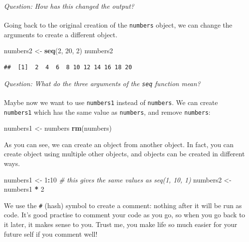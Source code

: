 \documentclass[
]{book}
\newenvironment{Shaded}{\begin{snugshade}}{\end{snugshade}}
\newcommand{\CommentTok}[1]{\textcolor[rgb]{0.56,0.35,0.01}{\textit{#1}}}
\newcommand{\DecValTok}[1]{\textcolor[rgb]{0.00,0.00,0.81}{#1}}
\newcommand{\KeywordTok}[1]{\textcolor[rgb]{0.13,0.29,0.53}{\textbf{#1}}}
\newcommand{\NormalTok}[1]{#1}
\newcommand{\OperatorTok}[1]{\textcolor[rgb]{0.81,0.36,0.00}{\textbf{#1}}}
\newcommand{\StringTok}[1]{\textcolor[rgb]{0.31,0.60,0.02}{#1}}
\begin{document}
\emph{Question: How has this changed the output?}\\
~\\

Going back to the original creation of the \texttt{numbers} object, we can change the
arguments to create a different object.

\begin{Shaded}
\begin{Highlighting}[]
\NormalTok{numbers2 <-}\StringTok{ }\KeywordTok{seq}\NormalTok{(}\DecValTok{2}\NormalTok{, }\DecValTok{20}\NormalTok{, }\DecValTok{2}\NormalTok{)}
\NormalTok{numbers2}
\end{Highlighting}
\end{Shaded}

\begin{verbatim}
##  [1]  2  4  6  8 10 12 14 16 18 20
\end{verbatim}

\emph{Question: What do the three arguments of the \texttt{seq} function mean?}\\
~\\

Maybe now we want to use \texttt{numbers1} instead of \texttt{numbers}. We can create \texttt{numbers1}
which has the same value as \texttt{numbers}, and remove \texttt{numbers}:

\begin{Shaded}
\begin{Highlighting}[]
\NormalTok{numbers1 <-}\StringTok{ }\NormalTok{numbers}
\KeywordTok{rm}\NormalTok{(numbers)}
\end{Highlighting}
\end{Shaded}

As you can see, we can create an object from another object. In fact, you can
create object using multiple other objects, and objects can be created in
different ways.

\begin{Shaded}
\begin{Highlighting}[]
\NormalTok{numbers1 <-}\StringTok{ }\DecValTok{1}\OperatorTok{:}\DecValTok{10}  \CommentTok{# this gives the same values as seq(1, 10, 1)}
\NormalTok{numbers2 <-}\StringTok{ }\NormalTok{numbers1 }\OperatorTok{*}\StringTok{ }\DecValTok{2}
\end{Highlighting}
\end{Shaded}

We use the \texttt{\#} (hash) symbol to create a comment: nothing after it will be run
as code. It's good practise to comment your code as you go, so when you
go back to it later, it makes sense to you. Trust me, you make life so much
easier for your future self if you comment well!\\
~\\
\end{document}
